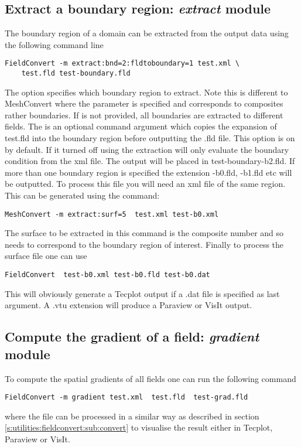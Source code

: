 \subsection{Extract a boundary region: \textit{extract} module}
The boundary region of a domain can be extracted from the output 
data using the following command line
%
\begin{lstlisting}[style=BashInputStyle]
FieldConvert -m extract:bnd=2:fldtoboundary=1 test.xml \
	test.fld test-boundary.fld
\end{lstlisting}
%
The option  specifies which boundary region to extract. 
Note this is different to MeshConvert where the parameter  
is specified and corresponds to composites rather boundaries. If  
is not provided, all boundaries are extracted to different fields. The  
is an optional command argument which copies the expansion of test.fld into 
the boundary region before outputting the .fld file. This option is on by default. 
If it turned off using \inltt{fldtoboundary=0} the extraction will only evaluate the 
boundary condition from the xml file. The output will be placed in test-boundary-b2.fld. 
If more than one boundary region is specified the extension -b0.fld, -b1.fld etc will be 
outputted. To process this file you will need an xml file of the same region. 
This can be generated using the command:
%
\begin{lstlisting}[style=BashInputStyle]
MeshConvert -m extract:surf=5  test.xml test-b0.xml
\end{lstlisting}
%
The surface to be extracted in this command is the composite 
number and so needs to correspond to the boundary region 
of interest. Finally to process the surface file one can use
%
\begin{lstlisting}[style=BashInputStyle]
FieldConvert  test-b0.xml test-b0.fld test-b0.dat
\end{lstlisting}
%
This will obviously generate a Tecplot output if a .dat file 
is specified as last argument. A .vtu extension will produce 
a Paraview or VisIt output.
%
%
%
\subsection{Compute the gradient of a field: \textit{gradient} module}
To compute the spatial gradients of all fields one can run the following command
%
\begin{lstlisting}[style=BashInputStyle]
FieldConvert -m gradient test.xml  test.fld  test-grad.fld
\end{lstlisting}
%
where the file  can be processed in a similar 
way as described in section \ref{s:utilities:fieldconvert:sub:convert}
to visualise the result either in Tecplot, Paraview or VisIt.
%
%

